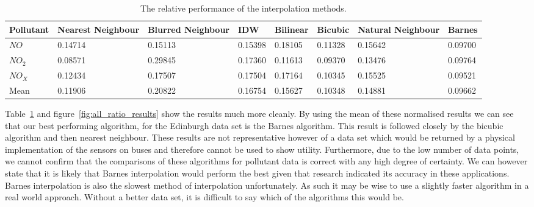 		\begin{table}[H]
			\centering
    		\begin{tabularx}{\linewidth}{|X|X|X|X|X|X|X|X|}
    			\hline
				Pollutant & Nearest Neighbour & Blurred Neighbour & IDW & Bilinear & Bicubic & Natural Neighbour & Barnes \\ \hline
				$NO$ & 0.14714 & 0.15113 & 0.15398 & 0.18105 & 0.11328 & 0.15642 & 0.09700 \\
				$NO_{2}$ & 0.08571 & 0.29845 & 0.17360 & 0.11613 & 0.09370 & 0.13476 & 0.09764\\
				$NO_{X}$ & 0.12434 & 0.17507 & 0.17504 & 0.17164 & 0.10345 & 0.15525 & 0.09521 \\ \hline
				Mean & 0.11906 & 0.20822 & 0.16754 & 0.15627 & 0.10348 & 0.14881 & 0.09662 \\
				\hline
			\end{tabularx}
			\caption{The relative performance of the interpolation methods.}
			\label{tab:all_ratio_results}
		\end{table}


		Table~\ref{tab:all_ratio_results} and figure~\ref{fig:all_ratio_results} show the results much more cleanly. By using the mean of these normalised results we can see that our best performing algorithm, for the Edinburgh data set is the Barnes algorithm. This result is followed closely by the bicubic algorithm and then nearest neighbour. These results are not representative however of a data set which would be returned  by a physical implementation of the sensors on buses and therefore cannot be used to show utility. Furthermore, due to the low number of data points, we cannot confirm that the comparisons of these algorithms for pollutant data is correct with any high degree of certainty. We can however state that it is likely that Barnes interpolation would perform the best given that research indicated its accuracy in these applications. Barnes interpolation is also the slowest method of interpolation unfortunately. As such it may be wise to use a slightly faster algorithm in a real world approach. Without a better data set, it is difficult to say which of the algorithms this would be. 

